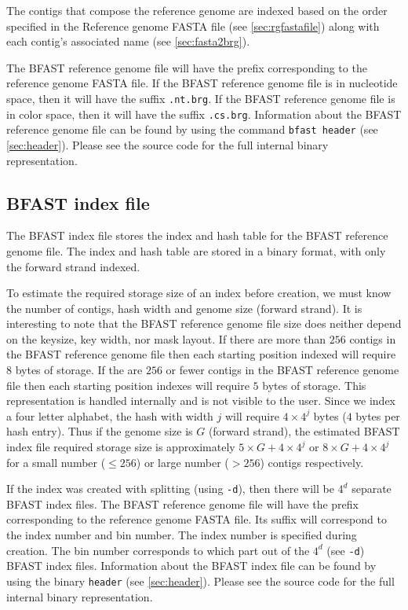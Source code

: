 \documentclass[a4paper,12pt]{book}
\newcommand{\TT}[1]{{\tt #1}} %
\newcommand{\rGFF}{reference genome FASTA file}
\newcommand{\RGFF}{Reference genome FASTA file}
\newcommand{\BRGF}{BFAST reference genome file} %
\newcommand{\BIF}{BFAST index file} %
\begin{document}
The contigs that compose the reference genome are indexed based on the order specified in the \RGFF{} (see \autoref{sec:rgfastafile}) along with each contig's associated name (see \autoref{sec:fasta2brg}).

The \BRGF{} will have the prefix corresponding to the \rGFF{}.
If the \BRGF{} is in nucleotide space, then it will have the suffix \TT{.nt.brg}.
If the \BRGF{} is in color space, then it will have the suffix \TT{.cs.brg}.
Information about the \BRGF{} can be found by using the command \TT{bfast header} (see \autoref{sec:header}).
Please see the source code for the full internal binary representation.

\subsection{\BIF{}}
\label{sec:bif}
The \BIF{} stores the index and hash table for the \BRGF{}.
The index and hash table are stored in a binary format, with only the forward strand indexed.

To estimate the required storage size of an index before creation, we must know the number of contigs, hash width and genome size (forward strand).
It is interesting to note that the \BRGF{} size does neither depend on the keysize, key width, nor mask layout. 
If there are more than $256$ contigs in the \BRGF{} then each starting position indexed will require $8$ bytes of storage.
If the are $256$ or fewer contigs in the \BRGF{} then each starting position indexes will require $5$ bytes of storage.
This representation is handled internally and is not visible to the user.
Since we index a four letter alphabet, the hash with width $j$ will require $4\times4^j$ bytes ($4$ bytes per hash entry).
Thus if the genome size is $G$ (forward strand), the estimated \BIF{} required storage size is approximately $5\times G + 4\times 4^j$ or $8\times G + 4\times 4^j$ for a small number ($\leq 256$) or large number ($>256$) contigs respectively. 

If the index was created with splitting (using \TT{-d}), then there will be $4^d$ separate \BIF{s}.
The \BRGF{} will have the prefix corresponding to the \rGFF{}.
Its suffix will correspond to the index number and bin number.
The index number is specified during creation.
The bin number corresponds to which part out of the $4^d$ (see \TT{-d}) \BIF{s}.
Information about the \BIF{} can be found by using the binary \TT{header} (see \autoref{sec:header}).
Please see the source code for the full internal binary representation.
\end{document}
